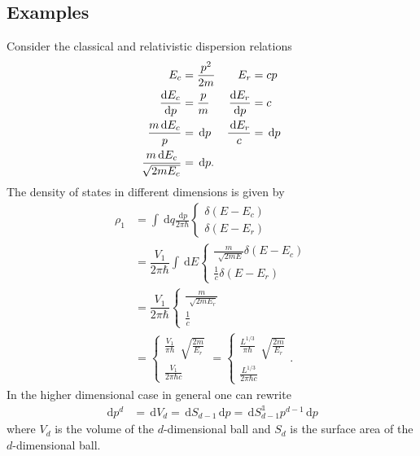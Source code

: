 \documentclass[a4paper,10pt]{article}
\newcommand{\td}{\,\text{d}}
\newcommand{\id}{\mathds{1}}
\numberwithin{equation}{section}
\begin{document}
\begin{multicols}{2}
\subsection{Examples}
Consider the classical and relativistic dispersion relations
\begin{align} 
  E_c &= \dfrac{p^2}{2m} & E_r &= cp\\
  \diff[]{E_c}{p} &= \dfrac{p}{m} & \diff[]{E_r}{p} &= c\\
  \dfrac{m\td E_c}{p} &= \td p & \dfrac{\td E_r}{c} &= \td p\\
  \dfrac{m\td E_c}{\,\sqrt[]{2mE_c}} &= \td p
.\end{align} 
The density of states in different dimensions is given by
\begin{align} 
  \rho _1 &= \int_{}^{}\td q\tfrac{\td p}{2\pi \hbar } \begin{cases}
    \delta (E-E_c)\\
    \delta (E-E_r)
  \end{cases}\\
          &= \dfrac{V_1}{2\pi \hbar }\int_{}^{}\td E \begin{cases}
            \tfrac{m}{\,\sqrt[]{2mE}}\delta (E-E_c)\\
            \tfrac{1}{c}\delta (E-E_r)
          \end{cases}\\
          &= \dfrac{V_1}{2\pi \hbar }\begin{cases}
            \tfrac{m}{\,\sqrt[]{2mE_r}}\\
            \tfrac{1}{c}
          \end{cases}\\
          &= \begin{cases}
            \tfrac{V_1}{\pi \hbar }\,\sqrt[]{\tfrac{2m}{E_r}}\\
            \tfrac{V_1}{2\pi \hbar c}
          \end{cases}
          = \begin{cases}
            \tfrac{L^{1/3}}{\pi \hbar }\,\sqrt[]{\tfrac{2m}{E_r}}\\
            \tfrac{L^{1/3}}{2\pi \hbar c}
          \end{cases}
.\end{align} 
In the higher dimensional case in general one can rewrite
\begin{align} 
  \td p^d &= \td V_d = \td S_{d-1}\td p = \td S_{d-1}^\id p^{d-1}\td p 
\end{align} 
where $V_d$ is the volume of the $d$-dimensional ball and $S_d$ is the surface area of the $d$-dimensional ball.

\end{multicols}
\end{document}
